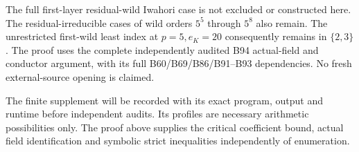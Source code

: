 \begin{remark}
\label{rem:B-RD95-scope}
The full first-layer residual-wild Iwahori case is not excluded or
constructed here. The residual-irreducible cases of wild orders
$5^5$ through $5^8$ also remain. The unrestricted first-wild least
index at $p=5,e_K=20$ consequently remains in $\{2,3\}$.
The proof uses the complete independently audited B94 actual-field
and conductor argument, with its full B60/B69/B86/B91--B93
dependencies. No fresh external-source opening is claimed.

The finite supplement will be recorded with its exact program,
output and runtime before independent audits. Its profiles are
necessary arithmetic possibilities only. The proof above supplies
the critical coefficient bound, actual field identification and
symbolic strict inequalities independently of enumeration.
\end{remark}
